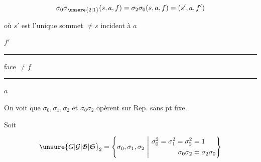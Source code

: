 \[
 \sigma_0\sigma_{\unsure{2|1}}(s,a,f)=\sigma_2\sigma_0(s,a,f)=(s',a,f')
\]

où $s'$ est l'unique sommet $\ne s$ incident à $a$

$f'$ \rule{2.4cm}{0.35pt} face $\ne f$ \rule{1.5cm}{0.35pt} $a$

On voit que $\sigma_0,\sigma_1,\sigma_2$ et $\sigma_0\sigma_2$ opèrent sur Rep. sans pt fixe.

Soit

\[
 \unsure{G|\mathcal G|\mathfrak G|\mathfrak S}_2=
 \left\{\sigma_0,\sigma_1,\sigma_2\ \middle|\
 \begin{aligned}
 \sigma_0^2=\sigma_1^2=\sigma_2^2&=1\\
 \sigma_0\sigma_2&=\sigma_2\sigma_0
 \end{aligned}\right\}
\]


